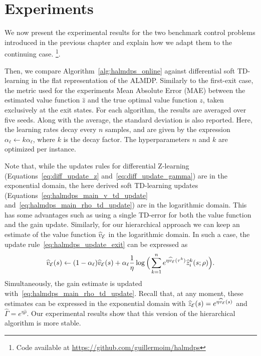 \section{Experiments}

We now present the experimental results for the two benchmark control problems introduced in the previous chapter and explain how we adapt them to the continuing case. \footnote{Code available at \url{https://github.com/guillermoim/halmdps}}.

Then, we compare Algorithm~\ref{alg:halmdps_online} against differential soft TD-learning in the flat representation of the ALMDP. Similarly to the first-exit case, the metric used for the experiments Mean Absolute Error (MAE) between the estimated value function $\widehat z$ and the true optimal value function $z$, taken exclusively at the exit states. For each algorithm, the results are averaged over five seeds. Along with the average, the standard deviation is also reported. Here, the learning rates decay every $n$ samples, and are given by the expression $\alpha_\ell \leftarrow k \alpha_\ell$, where $k$ is the decay factor. The hyperparameters $n$ and $k$ are optimized per instance. 

Note that, while the updates rules for differential Z-learning (Equations~\eqref{eq:diff_update_z} and~\eqref{eq:diff_update_gamma}) are in the exponential domain, the here derived soft TD-learning updates (Equations~\eqref{eq:halmdps_main_v_td_update} and~\eqref{eq:halmdps_main_rho_td_update}) are in the logarithmic domain. This has some advantages such as using a single TD-error for both the value function and the gain update. Similarly, for our hierarchical approach we can keep an estimate of the value function $\widehat v_{\mathcal{E}}$ in the logarithmic domain. In such a case, the update rule~\eqref{eq:halmdps_update_exit} can be expressed as 
\begin{equation*}
    \widehat v_{\mathcal{E}}(s)\gets (1-\alpha_\ell) \widehat v_{\mathcal{E}}(s) + \alpha_\ell\frac{1}{\eta} \log\Big(\sum_{k=1}^n e^{\eta \widehat  v_{\mathcal{E}}(\tau^k)} \widehat z_i^k(s;\rho)\Big).
\end{equation*}
Simultaneously, the gain estimate is updated with~\eqref{eq:halmdps_main_rho_td_update}. Recall that, at any moment, these estimates can be expressed in the exponential domain with $\widehat z_{\mathcal{E}}(s)=e^{\eta\widehat v_{\mathcal{E}}(s)}$ and $\widehat\Gamma=e^{\eta\widehat\rho}$. Our experimental results show that this version of the hierarchical algorithm is more stable.

